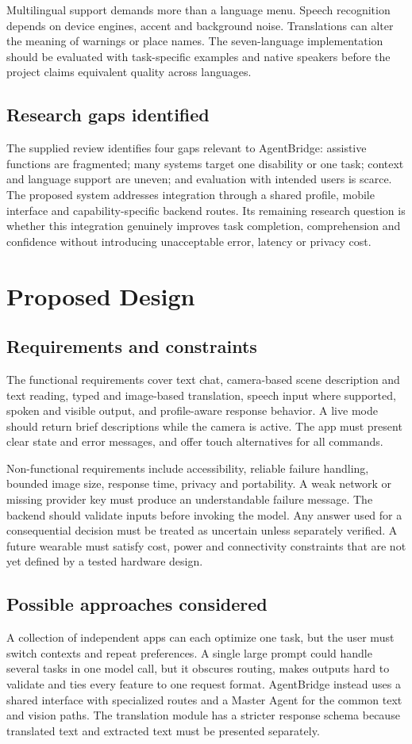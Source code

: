 \documentclass[12pt,a4paper,oneside]{report}
\begin{document}
Multilingual support demands more than a language menu. Speech recognition depends on device engines, accent and background noise. Translations can alter the meaning of warnings or place names. The seven-language implementation should be evaluated with task-specific examples and native speakers before the project claims equivalent quality across languages.

\section{Research gaps identified}
The supplied review identifies four gaps relevant to AgentBridge: assistive functions are fragmented; many systems target one disability or one task; context and language support are uneven; and evaluation with intended users is scarce. The proposed system addresses integration through a shared profile, mobile interface and capability-specific backend routes. Its remaining research question is whether this integration genuinely improves task completion, comprehension and confidence without introducing unacceptable error, latency or privacy cost.

\chapter{Proposed Design}
\section{Requirements and constraints}
The functional requirements cover text chat, camera-based scene description and text reading, typed and image-based translation, speech input where supported, spoken and visible output, and profile-aware response behavior. A live mode should return brief descriptions while the camera is active. The app must present clear state and error messages, and offer touch alternatives for all commands.

Non-functional requirements include accessibility, reliable failure handling, bounded image size, response time, privacy and portability. A weak network or missing provider key must produce an understandable failure message. The backend should validate inputs before invoking the model. Any answer used for a consequential decision must be treated as uncertain unless separately verified. A future wearable must satisfy cost, power and connectivity constraints that are not yet defined by a tested hardware design.

\section{Possible approaches considered}
A collection of independent apps can each optimize one task, but the user must switch contexts and repeat preferences. A single large prompt could handle several tasks in one model call, but it obscures routing, makes outputs hard to validate and ties every feature to one request format. AgentBridge instead uses a shared interface with specialized routes and a Master Agent for the common text and vision paths. The translation module has a stricter response schema because translated text and extracted text must be presented separately.
\end{document}
